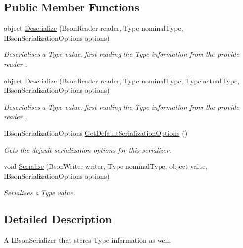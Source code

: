 \subsection*{Public Member Functions}
\begin{DoxyCompactItemize}
\item 
object \hyperlink{classCqrs_1_1Mongo_1_1Serialisers_1_1TypeSerialiser_a38d61038bc9aab09572c9c05e8b9460b_a38d61038bc9aab09572c9c05e8b9460b}{Deserialize} (Bson\+Reader reader, Type nominal\+Type, I\+Bson\+Serialization\+Options options)
\begin{DoxyCompactList}\small\item\em Deserialises a Type value, first reading the Type information from the provide {\itshape reader} . \end{DoxyCompactList}\item 
object \hyperlink{classCqrs_1_1Mongo_1_1Serialisers_1_1TypeSerialiser_aca73371a2a3ddd291d023584cb676ed3_aca73371a2a3ddd291d023584cb676ed3}{Deserialize} (Bson\+Reader reader, Type nominal\+Type, Type actual\+Type, I\+Bson\+Serialization\+Options options)
\begin{DoxyCompactList}\small\item\em Deserialises a Type value, first reading the Type information from the provide {\itshape reader} . \end{DoxyCompactList}\item 
I\+Bson\+Serialization\+Options \hyperlink{classCqrs_1_1Mongo_1_1Serialisers_1_1TypeSerialiser_af0e31e1a524812836d0b73dca29b1332_af0e31e1a524812836d0b73dca29b1332}{Get\+Default\+Serialization\+Options} ()
\begin{DoxyCompactList}\small\item\em Gets the default serialization options for this serializer. \end{DoxyCompactList}\item 
void \hyperlink{classCqrs_1_1Mongo_1_1Serialisers_1_1TypeSerialiser_aed86906daa5c18a29fd06fb3d9d3fd13_aed86906daa5c18a29fd06fb3d9d3fd13}{Serialize} (Bson\+Writer writer, Type nominal\+Type, object value, I\+Bson\+Serialization\+Options options)
\begin{DoxyCompactList}\small\item\em Serialises a Type value. \end{DoxyCompactList}\end{DoxyCompactItemize}


\subsection{Detailed Description}
A I\+Bson\+Serializer that stores Type information as well. 



